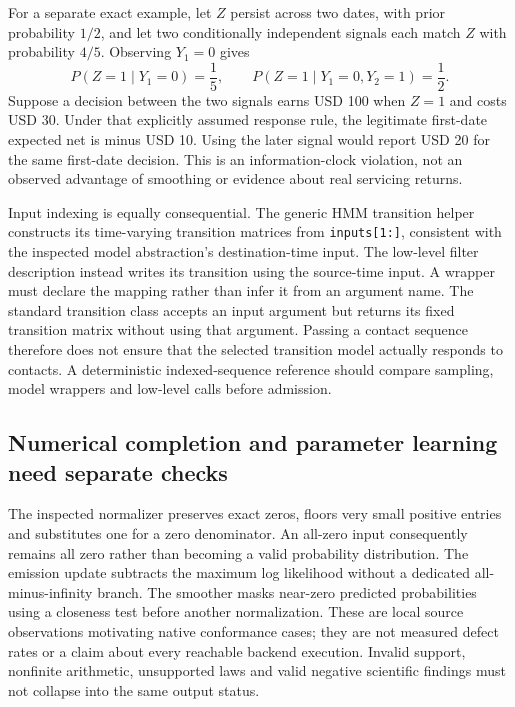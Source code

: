 For a separate exact example, let $Z$ persist across two dates, with prior
probability $1/2$, and let two conditionally independent signals each match $Z$
with probability $4/5$. Observing $Y_1=0$ gives
\begin{equation}
 P(Z=1\mid Y_1=0)=\frac15,\qquad
 P(Z=1\mid Y_1=0,Y_2=1)=\frac12.
 \label{exec19:dynamax-filter}
\end{equation}
Suppose a decision between the two signals earns USD 100 when $Z=1$ and costs
USD 30. Under that explicitly assumed response rule, the legitimate first-date
expected net is minus USD 10. Using the later signal would report USD 20 for
the same first-date decision. This is an information-clock violation, not an
observed advantage of smoothing or evidence about real servicing returns.
\citep{exec19_dynamax_reference}

Input indexing is equally consequential. The generic HMM transition helper
constructs its time-varying transition matrices from \texttt{inputs[1:]},
consistent with the inspected model abstraction's destination-time input.
The low-level filter description instead writes its transition using the
source-time input. A wrapper must declare the mapping rather than infer it from
an argument name. The standard transition class accepts an input argument but
returns its fixed transition matrix without using that argument. Passing a
contact sequence therefore does not ensure that the selected transition model
actually responds to contacts. A deterministic indexed-sequence reference
should compare sampling, model wrappers and low-level calls before admission.
\citep{exec19_dynamax_source}

\subsection{Numerical completion and parameter learning need separate checks}
\label{exec19:dynamax-numerics}

The inspected normalizer preserves exact zeros, floors very small positive
entries and substitutes one for a zero denominator. An all-zero input consequently
remains all zero rather than becoming a valid probability distribution. The
emission update subtracts the maximum log likelihood without a dedicated
all-minus-infinity branch. The smoother masks near-zero predicted probabilities
using a closeness test before another normalization. These are local source
observations motivating native conformance cases; they are not measured defect
rates or a claim about every reachable backend execution. Invalid support,
nonfinite arithmetic, unsupported laws and valid negative scientific findings
must not collapse into the same output status.\citep{exec19_dynamax_source}

